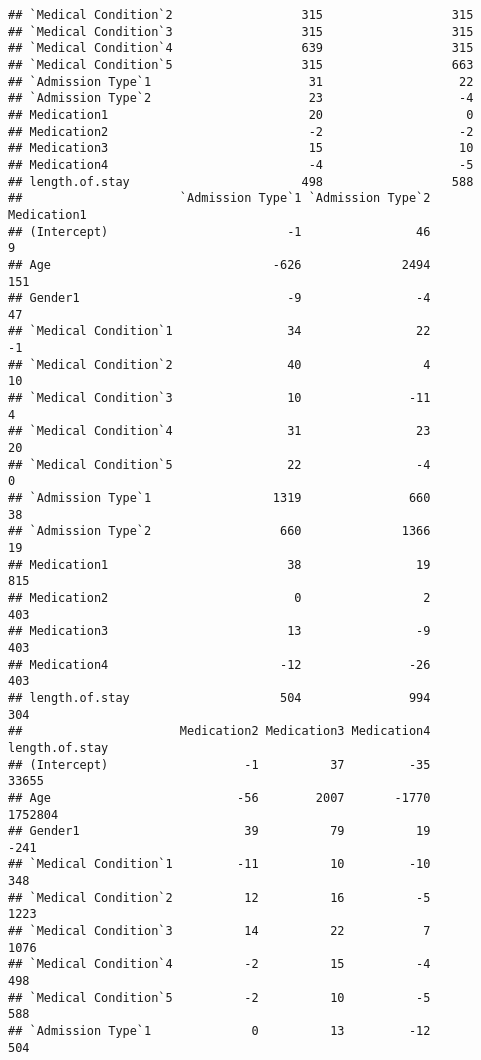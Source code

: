 \documentclass[
]{article}
\begin{document}
\begin{verbatim}
## `Medical Condition`2                  315                  315
## `Medical Condition`3                  315                  315
## `Medical Condition`4                  639                  315
## `Medical Condition`5                  315                  663
## `Admission Type`1                      31                   22
## `Admission Type`2                      23                   -4
## Medication1                            20                    0
## Medication2                            -2                   -2
## Medication3                            15                   10
## Medication4                            -4                   -5
## length.of.stay                        498                  588
##                      `Admission Type`1 `Admission Type`2 Medication1
## (Intercept)                         -1                46           9
## Age                               -626              2494         151
## Gender1                             -9                -4          47
## `Medical Condition`1                34                22          -1
## `Medical Condition`2                40                 4          10
## `Medical Condition`3                10               -11           4
## `Medical Condition`4                31                23          20
## `Medical Condition`5                22                -4           0
## `Admission Type`1                 1319               660          38
## `Admission Type`2                  660              1366          19
## Medication1                         38                19         815
## Medication2                          0                 2         403
## Medication3                         13                -9         403
## Medication4                        -12               -26         403
## length.of.stay                     504               994         304
##                      Medication2 Medication3 Medication4 length.of.stay
## (Intercept)                   -1          37         -35          33655
## Age                          -56        2007       -1770        1752804
## Gender1                       39          79          19           -241
## `Medical Condition`1         -11          10         -10            348
## `Medical Condition`2          12          16          -5           1223
## `Medical Condition`3          14          22           7           1076
## `Medical Condition`4          -2          15          -4            498
## `Medical Condition`5          -2          10          -5            588
## `Admission Type`1              0          13         -12            504

\end{verbatim}
\end{document}

